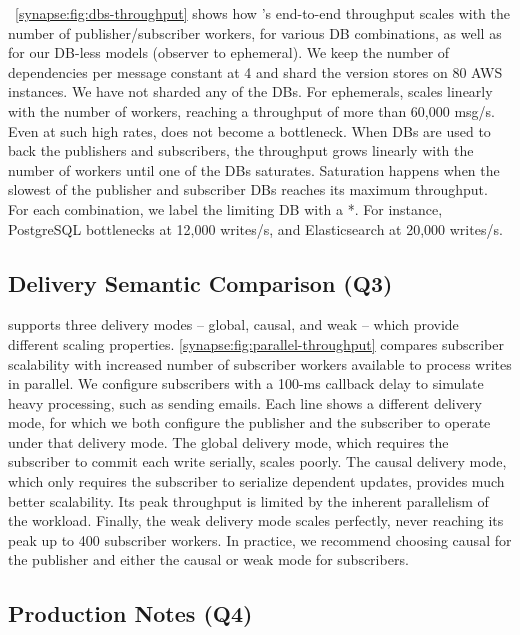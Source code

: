 \F~\ref{synapse:fig:dbs-throughput} shows how \synapse's end-to-end throughput scales
with the number of publisher/subscriber workers, for various DB
combinations, as well as for our
DB-less models (observer to ephemeral). We keep the number of dependencies per
message constant at 4 and shard the version stores on 80 AWS instances.
We have not sharded any of the DBs.
For ephemerals, \synapse scales linearly with the number of
workers, reaching a throughput of more than 60,000 msg/s. Even at such high
rates, \synapse does not become a bottleneck.  When DBs are used to
back the publishers and subscribers, the throughput grows linearly with the
number of workers until one of the DBs saturates. Saturation happens when the
slowest of the publisher and subscriber DBs reaches its maximum throughput. For each combination, we label the limiting DB with a *. For
instance, PostgreSQL bottlenecks at 12,000 writes/s, and Elasticsearch at
20,000 writes/s.


\subsection{Delivery Semantic Comparison (Q3)}
\label{synapse:sec:evaluation:delivery}

\synapse supports three delivery modes -- global, causal, and weak -- which
provide different scaling properties.
\F\ref{synapse:fig:parallel-throughput} compares subscriber scalability with 
increased number of subscriber workers available to process writes in parallel.
We configure subscribers with a 100-ms callback delay to simulate
heavy processing, such as sending emails.
Each line shows a different delivery mode, for which we both configure the
publisher and the subscriber to operate under that delivery mode.
The global delivery mode, which requires the
subscriber to commit each write serially, scales poorly.  The causal
delivery mode, which only requires the subscriber to serialize dependent
updates, provides much better scalability.  Its peak throughput is limited by
the inherent parallelism of the workload.  Finally, the weak delivery mode
scales perfectly, never reaching its peak up to 400 subscriber workers.
In practice, we recommend choosing causal for the publisher and either the
causal or weak mode for subscribers.

\subsection{Production Notes (Q4)}
\label{synapse:sec:eval:ease-of-use}

